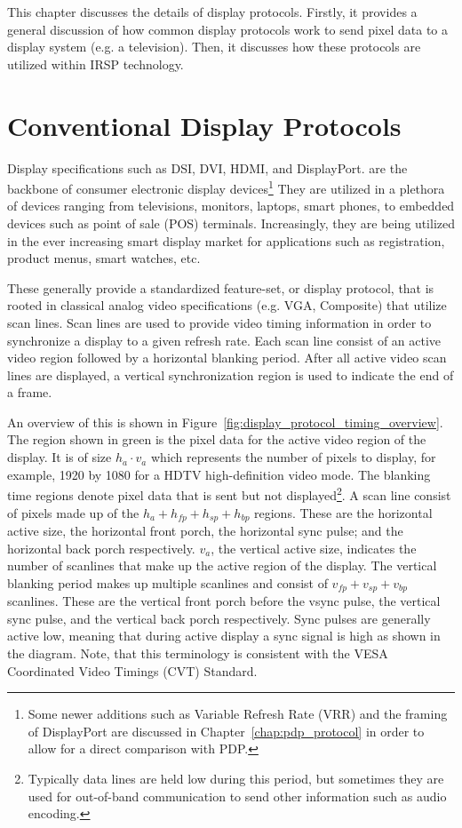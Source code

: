 \label{chap:display_protocols}
This chapter discusses the details of display protocols. Firstly, it provides a general discussion of how common display protocols work to send pixel data to a display system (e.g. a television). Then, it discusses how these protocols are utilized within IRSP technology.

\section{Conventional Display Protocols}
    \label{sec:conventional_display_protocols}

    Display specifications such as DSI\cite{HDMIForum2017}, DVI\cite{DDWG1999}, HDMI\cite{HDMIForum2018}, and DisplayPort.\cite{VESA2016} are the backbone of consumer electronic display devices\footnote{Some newer additions such as Variable Refresh Rate (VRR) and the framing of DisplayPort are discussed in Chapter~\ref{chap:pdp_protocol} in order to allow for a direct comparison with PDP.} They are utilized in a plethora of devices ranging from televisions, monitors, laptops, smart phones, to embedded devices such as point of sale (POS) terminals. Increasingly, they are being utilized in the ever increasing smart display market for applications such as registration, product menus, smart watches, etc.

    These generally provide a standardized feature-set, or display protocol, that is rooted in classical analog video specifications (e.g. VGA, Composite)\cite{NI2018} that utilize scan lines\cite{Neal1998}. Scan lines are used to provide video timing information in order to synchronize a display to a given refresh rate. Each scan line consist of an active video region followed by a horizontal blanking period. After all active video scan lines are displayed, a vertical synchronization region is used to indicate the end of a frame.

    An overview of this is shown in Figure~\ref{fig:display_protocol_timing_overview}. The region shown in green is the pixel data for the active video region of the display. It is of size $h_a\cdot v_a$ which represents the number of pixels to display, for example, 1920 by 1080 for a HDTV high-definition video mode\cite{MythTV2015}. The blanking time regions denote pixel data that is sent but not displayed\footnote{Typically data lines are held low during this period, but sometimes they are used for out-of-band communication to send other information such as audio encoding.}. A scan line consist of pixels made up of the $h_a+h_{fp}+h_{sp}+h_{bp}$ regions. These are the horizontal active size, the horizontal front porch, the horizontal sync pulse; and the horizontal back porch respectively. $v_a$, the vertical active size, indicates the number of scanlines that make up the active region of the display. The vertical blanking period makes up multiple scanlines and consist of $v_{fp}+v_{sp}+v_{bp}$ scanlines. These are the vertical front porch before the vsync pulse, the vertical sync pulse, and the vertical back porch respectively. Sync pulses are generally active low, meaning that during active display a sync signal is high as shown in the diagram. Note, that this terminology is consistent with the VESA Coordinated Video Timings (CVT) Standard\cite{VESA2013}.

